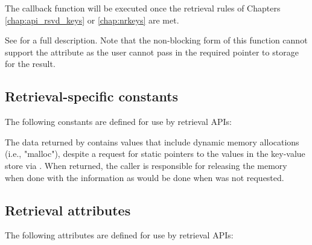 The callback function will be executed once the retrieval rules of Chapters \ref{chap:api_rsvd_keys} or \ref{chap:nrkeys} are met.

See  for a full description. Note that the non-blocking form of this function cannot support the  attribute as the user cannot pass in the required pointer to storage for the result.


\subsection{Retrieval-specific constants}

The following constants are defined for use by retrieval \acp{API}:

\begin{constantdesc}
%
The data returned by  contains values that include dynamic memory allocations (i.e., "malloc"), despite a request for static pointers to the values in the key-value store via .  When returned, the caller is responsible for releasing the memory when done with the information as would be done when  was not requested.
%
\end{constantdesc}


\subsection{Retrieval attributes}
\label{chap:api_kg:attr}

The following attributes are defined for use by retrieval \acp{API}:

